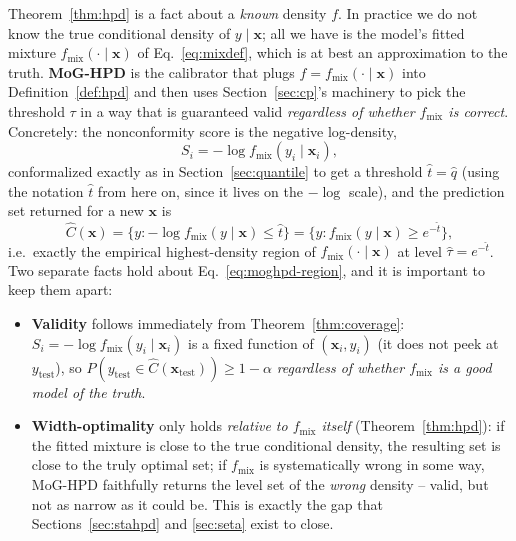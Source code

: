 \documentclass[11pt]{article}
\begin{document}
Theorem~\ref{thm:hpd} is a fact about a \emph{known} density $f$. In practice we do not know the
true conditional density of $y\mid\bm x$; all we have is the model's fitted mixture
$f_{\mathrm{mix}}(\cdot\mid\bm x)$ of Eq.~\eqref{eq:mixdef}, which is at best an approximation to
the truth. \textbf{MoG-HPD} \cite{izbicki2020cd,sadinle2019least} is the calibrator that plugs
$f=f_{\mathrm{mix}}(\cdot\mid\bm x)$ into
Definition~\ref{def:hpd} and then uses Section~\ref{sec:cp}'s machinery to pick the threshold
$\tau$ in a way that is guaranteed valid \emph{regardless of whether $f_{\mathrm{mix}}$ is
correct}. Concretely: the nonconformity score is the negative log-density,
\begin{equation}
S_i = -\log f_{\mathrm{mix}}(y_i \mid \bm x_i),
\end{equation}
conformalized exactly as in Section~\ref{sec:quantile} to get a threshold $\hat t = \hat q$ (using
the notation $\hat t$ from here on, since it lives on the $-\log$ scale), and the prediction set
returned for a new $\bm x$ is
\begin{equation}
\hat C(\bm x) = \big\{y : -\log f_{\mathrm{mix}}(y\mid\bm x) \le \hat t\big\}
= \big\{y : f_{\mathrm{mix}}(y\mid\bm x) \ge e^{-\hat t}\big\},
\label{eq:moghpd-region}
\end{equation}
i.e.\ exactly the empirical highest-density region of $f_{\mathrm{mix}}(\cdot\mid\bm x)$ at level
$\hat\tau = e^{-\hat t}$. Two separate facts hold about Eq.~\eqref{eq:moghpd-region}, and it is
important to keep them apart:
\begin{itemize}[leftmargin=1.5em]
\item \textbf{Validity} follows immediately from Theorem~\ref{thm:coverage}: $S_i = -\log
f_{\mathrm{mix}}(y_i\mid\bm x_i)$ is a fixed function of $(\bm x_i,y_i)$ (it does not peek at
$y_{\mathrm{test}}$), so $P(y_{\mathrm{test}}\in\hat C(\bm x_{\mathrm{test}}))\ge 1-\alpha$
\emph{regardless of whether $f_{\mathrm{mix}}$ is a good model of the truth}.
\item \textbf{Width-optimality} only holds \emph{relative to $f_{\mathrm{mix}}$ itself}
(Theorem~\ref{thm:hpd}): if the fitted mixture is close to the true conditional density, the
resulting set is close to the truly optimal set; if $f_{\mathrm{mix}}$ is systematically wrong in
some way, MoG-HPD faithfully returns the level set of the \emph{wrong} density -- valid, but not
as narrow as it could be. This is exactly the gap that Sections~\ref{sec:stahpd} and
\ref{sec:seta} exist to close.
\end{itemize}
\end{document}

